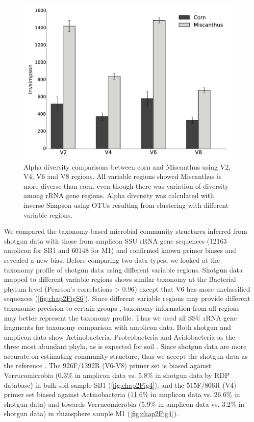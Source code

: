 \documentclass[]{msu-thesis}
\begin{document}
\begin{figure}[tbph!]
  \centering
  \includegraphics[width=1\textwidth]{figs/chap2_fig3}
  \caption[Alpha diversity comparisons between corn and Miscanthus using V2, V4, V6 and V8 regions]{Alpha diversity comparisons between corn and Miscanthus using V2, V4, V6 and V8 regions. All variable regions showed Miscanthus is more diverse than corn, even though there was variation of diversity among rRNA gene regions. Alpha diversity was calculated with inverse Simpson using OTUs resulting from clustering with different variable regions.}
  \label{fig:chap2Fig3}
\end{figure}


We compared the taxonomy-based microbial community structures inferred from shotgun data with those from amplicon SSU rRNA gene sequences (12163 amplicon for SB1 and 60148 for M1) and confirmed known primer biases and revealed a new bias. Before comparing two data types, we looked at the taxonomy profile of shotgun data using different variable regions. Shotgun data mapped to different variable regions shows similar taxonomy at the Bacterial phylum level (Pearson’s correlations > 0.96) except that V6 has more unclassified sequences (\cref{fig:chap2FigS6}). Since different variable regions may provide different taxonomic precision to certain groups \cite{guo_taxonomic_2013}, taxonomy information from all regions may better represent the taxonomy profile. Thus we used all SSU rRNA gene fragments for taxonomy comparison with amplicon data. Both shotgun and amplicon data show Actinobacteria, Proteobacteria and Acidobacteria as the three most abundant phyla, as is expected for soil \cite{janssen_identifying_2006}. Since shotgun data are more accurate on estimating community structure, thus we accept the shotgun data as the reference \cite{haas_chimeric_2011,shakya_comparative_2013}. The 926F/1392R (V6-V8) primer set is biased against Verrucomicrobia (0.3\% in amplicon data vs. 5.8\% in shotgun data by RDP database) in bulk soil sample SB1 (\cref{fig:chap2Fig4}), and the 515F/806R (V4) primer set biased against Actinobacteria (11.6\% in amplicon data vs. 26.6\% in shotgun data) and towards Verrucomicrobia (5.9\% in amplicon data vs. 3.2\% in shotgun data) in rhizosphere sample M1 (\cref{fig:chap2Fig4}).
\end{document}
